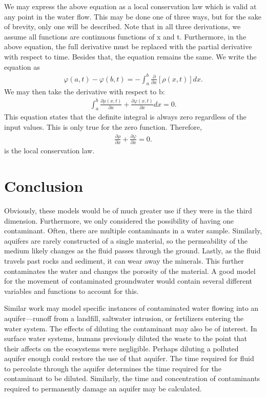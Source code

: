 \documentclass{article}
\begin{document}
We may express the above equation as a local conservation law which is valid at any point in the water flow. 
This may be done one of three ways, but for the sake of brevity, only one will be described. 
Note that in all three derivations, we assume all functions are continuous functions of x and t. 
Furthermore, in the above equation, the full derivative must be replaced with the partial derivative with respect to time.
Besides that, the equation remains the same. 
We write the equation as
    \begin{align}
        \varphi (a,t) - \varphi (b,t) = -\int_{a}^{b} \frac{\partial}{\partial x}[\rho (x,t)] dx.
    \end{align}
\noindent We may then take the derivative with respect to b:
    \begin{align}
        \int_{a}^{b} \frac{\partial \rho (x,t)}{\partial x} + \frac{\partial \varphi (x,t)}{\partial x} dx = 0.
    \end{align}
\noindent This equation states that the definite integral is always zero regardless of the input values. This is only true for the zero function. Therefore, 
    \begin{align}
        \frac{\partial \rho}{\partial x} + \frac{\partial \varphi}{\partial x} = 0.
    \end{align}
\noindent is the local conservation law\cite{7}.

\section*{Conclusion}
Obviously, these models would be of much greater use if they were in the third dimension. 
Furthermore, we only considered the possibility of having one contaminant. 
Often, there are multiple contaminants in a water sample. 
Similarly, aquifers are rarely constructed of a single material, so the permeability of the medium likely changes as the fluid passes through the ground. 
Lastly, as the fluid travels past rocks and sediment, it can wear away the minerals.
This further contaminates the water and changes the porosity of the material. 
A good model for the movement of contaminated groundwater would contain several different variables and functions to account for this. 

Similar work may model specific instances of contaminated water flowing into an aquifer—runoff from a landfill, saltwater intrusion, or fertilizers entering the water system. 
The effects of diluting the contaminant may also be of interest.
In surface water systems, humans previously diluted the waste to the point that their affects on the ecosystems were negligible. 
Perhaps diluting a polluted aquifer enough could restore the use of that aquifer. 
The time required for fluid to percolate through the aquifer determines the time required for the contaminant to be diluted. 
Similarly, the time and concentration of contaminants required to permanently damage an aquifer may be calculated. 
\end{document}
